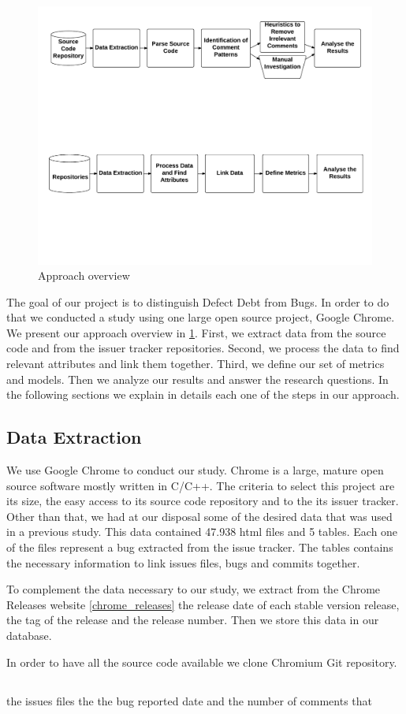 \begin{figure}[thb!]
  \caption{Approach overview}
  \centering
  \label{fig:approach}
  \includegraphics[width=1\textwidth]{figures/approach}
\end{figure}

The goal of our project is to distinguish Defect Debt from Bugs. In order to do that we conducted a study using one large open source project, Google Chrome. We present our approach overview in \ref{fig:approach}. First, we extract data from the source code and from the issuer tracker repositories. Second,  we process the data to find relevant attributes and link them together. Third, we define our set of metrics and models. Then we analyze our results and answer the research questions. In the following sections we explain in details each one of the steps in our approach.   

\subsection{Data Extraction}

We use Google Chrome to conduct our study. Chrome is a large, mature open source software mostly written in C/C++. The criteria to select this project are its size, the easy access to its source code repository and to the its issuer tracker. Other than that, we had at our disposal some of the desired data that was used in a previous study. This data contained 47.938 html files and 5 tables. Each one of the files represent a bug extracted from the issue tracker. The tables contains the necessary information to link issues files, bugs and commits together. 

To complement the data necessary to our study, we extract from the Chrome Releases website \ref{chrome_releases} the release date of each stable version release, the tag of the release and the release number. Then we store this data in our database.
 
In order to have all the source code available we clone Chromium Git repository. 

\subsection{}


the issues files the the bug reported date and the number of comments that 